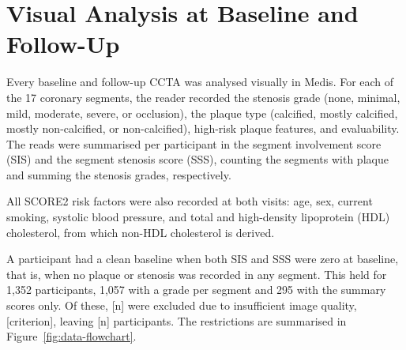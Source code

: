 \section{Visual Analysis at Baseline and Follow-Up}
\label{sec:data-plaque-location}

Every baseline and follow-up CCTA was analysed visually in Medis.
For each of the 17 coronary segments, the reader recorded the stenosis grade (none, minimal, mild, moderate, severe, or occlusion), the plaque type (calcified, mostly calcified, mostly non-calcified, or non-calcified), high-risk plaque features, and evaluability.
The reads were summarised per participant in the segment involvement score (SIS) and the segment stenosis score (SSS), counting the segments with plaque and summing the stenosis grades, respectively.

All SCORE2 risk factors \cite{score2_2021} were also recorded at both visits: age, sex, current smoking, systolic blood pressure, and total and high-density lipoprotein (HDL) cholesterol, from which non-HDL cholesterol is derived.

A participant had a clean baseline when both SIS and SSS were zero at baseline, that is, when no plaque or stenosis was recorded in any segment.
This held for 1,352 participants, 1,057 with a grade per segment and 295 with the summary scores only.
Of these, [n] were excluded due to insufficient image quality, [criterion], leaving [n] participants.
The restrictions are summarised in Figure~\ref{fig:data-flowchart}.

